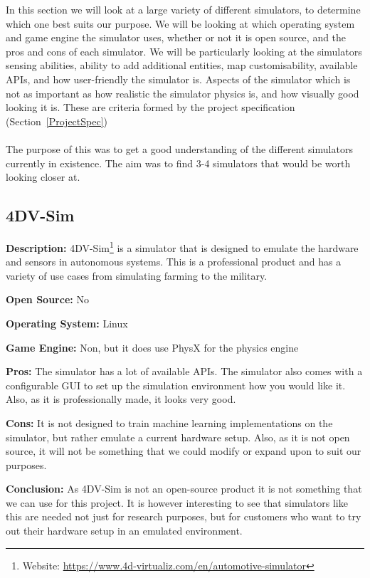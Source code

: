 In this section we will look at a large variety of different simulators, to determine which one best suits our purpose. We will be looking at which operating system and game engine the simulator uses, whether or not it is open source, and the pros and cons of each simulator. We will be particularly looking at the simulators sensing abilities, ability to add additional entities, map customisability, available APIs, and how user-friendly the simulator is. Aspects of the simulator which is not as important as how realistic the simulator physics is, and how visually good looking it is. These are criteria formed by the project specification (Section~\ref{ProjectSpec})
\\~\\
The purpose of this was to get a good understanding of the different simulators currently in existence. The aim was to find 3-4 simulators that would be worth looking closer at.

\subsection{4DV-Sim}
\textbf{Description:} 4DV-Sim\footnote{Website: \url{https://www.4d-virtualiz.com/en/automotive-simulator}} is a simulator that is designed to emulate the hardware and sensors in autonomous systems. This is a professional product and has a variety of use cases from simulating farming to the military.

\textbf{Open Source:} No

\textbf{Operating System:} Linux

\textbf{Game Engine:} Non, but it does use PhysX for the physics engine

\textbf{Pros:} The simulator has a lot of available APIs. The simulator also comes with a configurable GUI to set up the simulation environment how you would like it. Also, as it is professionally made, it looks very good.   

\textbf{Cons:} It is not designed to train machine learning implementations on the simulator, but rather emulate a current hardware setup. Also, as it is not open source, it will not be something that we could modify or expand upon to suit our purposes. 

\textbf{Conclusion:} As 4DV-Sim is not an open-source product it is not something that we can use for this project. It is however interesting to see that simulators like this are needed not just for research purposes, but for customers who want to try out their hardware setup in an emulated environment.


